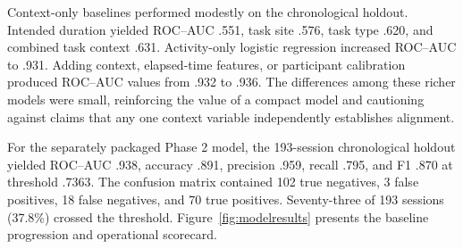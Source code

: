 \documentclass[12pt,a4paper]{article}
\begin{document}
Context-only baselines performed modestly on the chronological holdout. Intended duration yielded ROC--AUC .551, task site .576, task type .620, and combined task context .631. Activity-only logistic regression increased ROC--AUC to .931. Adding context, elapsed-time features, or participant calibration produced ROC--AUC values from .932 to .936. The differences among these richer models were small, reinforcing the value of a compact model and cautioning against claims that any one context variable independently establishes alignment.

For the separately packaged Phase 2 model, the 193-session chronological holdout yielded ROC--AUC .938, accuracy .891, precision .959, recall .795, and F1 .870 at threshold .7363. The confusion matrix contained 102 true negatives, 3 false positives, 18 false negatives, and 70 true positives. Seventy-three of 193 sessions (37.8\%) crossed the threshold. Figure~\ref{fig:modelresults} presents the baseline progression and operational scorecard.
\end{document}
